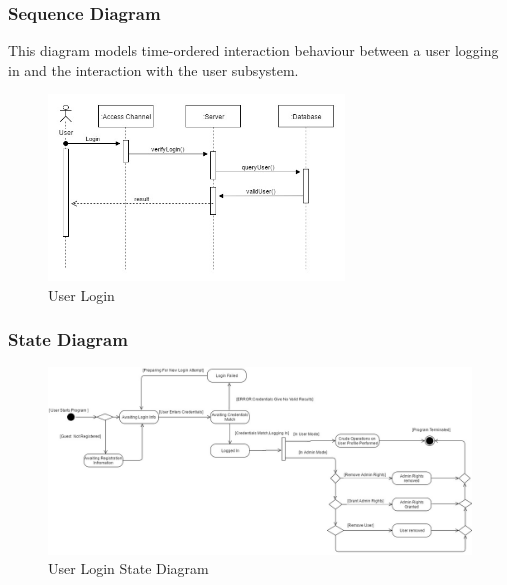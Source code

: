 \subsubsection{Sequence Diagram}
This diagram models time-ordered interaction behaviour between a user logging in and the interaction with the user subsystem.
\begin{figure}[H]
		\centering
		\includegraphics[width=0.7\textwidth]{user/img/UserSequence.jpg}
		\caption{User Login}
\end{figure}



\subsubsection{State Diagram}

\begin{figure}[H]
		\centering
		\includegraphics[width=\textwidth]{user/img/UserStateDiagram.jpg}
		\caption{User Login State Diagram}
\end{figure}




